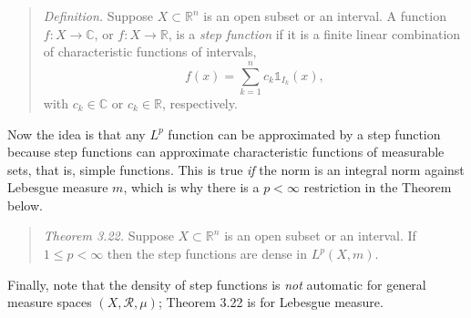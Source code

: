 \documentclass[12pt]{amsart}
\newcommand{\cR}{\mathcal{R}}
\newcommand{\CC}{{\mathbb{C}}}
\newcommand{\RR}{{\mathbb{R}}}
\newcommand{\one}{\mathds{1}}
\begin{document}
\begin{enumerate}
\medskip
\begin{quote}
\emph{Definition.}  Suppose $X \subset \RR^n$ is an open subset or an interval.  A function $f:X\to\CC$, or $f:X\to \RR$, is a \emph{step function} if it is a finite linear combination of characteristic functions of intervals,
	$$f(x) = \sum_{k=1}^n c_k \one_{I_k}(x),$$
with $c_k\in \CC$ or $c_k\in\RR$, respectively.
\end{quote}

\medskip \noindent Now the idea is that any $L^p$ function can be approximated by a step function because step functions can approximate characteristic functions of measurable sets, that is, simple functions.  This is true \emph{if} the norm is an integral norm against Lebesgue measure $m$, which is why there is a $p<\infty$ restriction in the Theorem below.

\medskip
\begin{quote}
\emph{Theorem 3.22.}  Suppose $X \subset \RR^n$ is an open subset or an interval.  If $1 \le p < \infty$ then the step functions are dense in $L^p(X,m)$.
\end{quote}

\medskip \noindent Finally, note that the density of step functions is \emph{not} automatic for general measure spaces $(X,\cR,\mu)$; Theorem 3.22 is for Lebesgue measure.
\end{enumerate}
\end{document}
